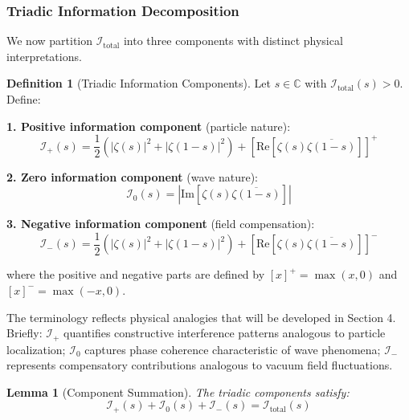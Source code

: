 \documentclass[12pt]{article}
\theoremstyle{plain}
\newtheorem{lemma}[theorem]{Lemma}
\theoremstyle{definition}
\newtheorem{definition}[theorem]{Definition}
\begin{document}
\subsubsection{Triadic Information Decomposition}

We now partition $\mathcal{I}_{\text{total}}$ into three components with distinct physical interpretations.

\begin{definition}[Triadic Information Components]\label{def:triadic}
Let $s \in \mathbb{C}$ with $\mathcal{I}_{\text{total}}(s) > 0$. Define:

\textbf{1. Positive information component} (particle nature):
\begin{equation}
\mathcal{I}_+(s) = \frac{1}{2}\left(|\zeta(s)|^2 + |\zeta(1-s)|^2\right) + \left[\text{Re}\left[\zeta(s)\overline{\zeta(1-s)}\right]\right]^+
\end{equation}

\textbf{2. Zero information component} (wave nature):
\begin{equation}
\mathcal{I}_0(s) = \left|\text{Im}\left[\zeta(s)\overline{\zeta(1-s)}\right]\right|
\end{equation}

\textbf{3. Negative information component} (field compensation):
\begin{equation}
\mathcal{I}_-(s) = \frac{1}{2}\left(|\zeta(s)|^2 + |\zeta(1-s)|^2\right) + \left[\text{Re}\left[\zeta(s)\overline{\zeta(1-s)}\right]\right]^-
\end{equation}

where the positive and negative parts are defined by $[x]^+ = \max(x, 0)$ and $[x]^- = \max(-x, 0)$.
\end{definition}

The terminology reflects physical analogies that will be developed in Section 4. Briefly: $\mathcal{I}_+$ quantifies constructive interference patterns analogous to particle localization; $\mathcal{I}_0$ captures phase coherence characteristic of wave phenomena; $\mathcal{I}_-$ represents compensatory contributions analogous to vacuum field fluctuations.

\begin{lemma}[Component Summation]\label{lem:component_sum}
The triadic components satisfy:
\begin{equation}
\mathcal{I}_+(s) + \mathcal{I}_0(s) + \mathcal{I}_-(s) = \mathcal{I}_{\text{total}}(s)
\end{equation}
\end{lemma}
\end{document}
